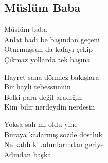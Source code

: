 \subsection{Müslüm Baba}

Müslüm baba \\
Anlat hadi be başından geçeni \\
Oturmuşsun da kafayı çekip \\
Çıkmaz yollarda tek başına

\noindent\newline
Hayret sana dönmez bakışlara \\
Bir hayli tebessümün \\
Belki para değil aradığın \\
Kim bilir nerdeydin nerdesin

\noindent\newline
Yoksa salı mı oldu yine \\
Buraya kadarmış sözde dostluk \\
Ne kaldı ki adımlarından geriye \\
Adından başka